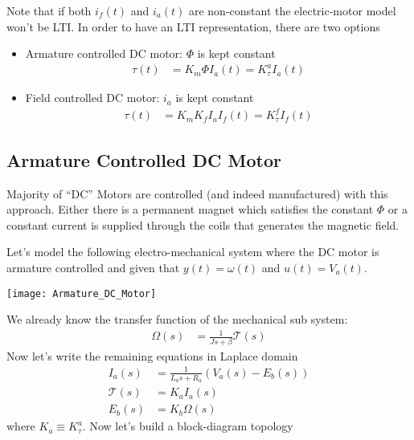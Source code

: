 \documentclass[twoside]{article}
\begin{document}
\vspace{12pt}
%
Note that if both $i_f(t)$ and $i_a(t)$ are non-constant the electric-motor model 
won't be LTI. In order to have an LTI representation, there are two options
%
\begin{itemize}
	\item Armature controlled DC motor: $\Phi$ is kept constant 
	\begin{align*}
		\tau(t) &= K_m \Phi I_a(t) = K_{\tau}^a I_a(t)
	\end{align*}
	\item Field controlled DC motor: $i_a$ is kept constant 
	\begin{align*}
		\tau(t) &= K_m K_f I_a I_f(t) = K_{\tau}^f I_f(t)
	\end{align*}
\end{itemize}

\subsection{Armature Controlled DC Motor}

Majority of ``DC'' Motors are controlled (and indeed manufactured) with this approach. Either
there is a permanent magnet which satisfies the constant $\Phi$ or a constant current is supplied
through the coils that generates the magnetic field.

Let's model the following electro-mechanical system where the DC motor is armature controlled 
and given that $y(t) = \omega(t)$ and $u(t) = V_a(t)$.

  \begin{minipage}[h]{1\linewidth}
    \begin{center}
      \texttt{[image: Armature\_DC\_Motor]}
    \end{center}
  \end{minipage} 
 
 We already know the transfer function of the mechanical sub system:
\begin{align*}
	\Omega(s) &= \frac{1}{J s + \beta} \mathcal{T}(s)
\end{align*}
 Now let's write the remaining equations in Laplace domain
 \begin{align*}
	I_a(s) &= \frac{1}{L_a s + R_a} \left( V_a(s) - E_b(s) \right)
	\\
	\mathcal{T}(s) &= K_a I_a(s)
	\\
	E_b(s) &= K_b \Omega(s)
\end{align*}
%
where $K_a \equiv K_{\tau}^a$. Now let's build a block-diagram topology
\end{document}
